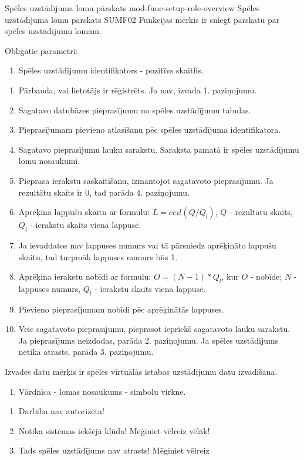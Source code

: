 \moduleFunctionTable
{Spēles uzstādījuma lomu pārskats}
{mod-func-setup-role-overview}
{Spēles uzstādījuma lomu pārskats}
{SUMF02}
{
	Funkcijas mērķis ir sniegt pārskatu par spēles uzstādījumu lomām.
}
{
	Obligātie parametri:
	\begin{enumerate}
		\item Spēles uzstādījumu identifikators - pozitīvs skaitlis.
	\end{enumerate}
}
{
	\begin{enumerate}
		\item Pārbauda, vai lietotājs ir rēģistrēts. Ja nav, izvada 1. paziņojumu.
		\item Sagatavo datubāzes pieprasījumu no spēles uzstādījumu tabulas.
		\item Pieprasījumam pievieno atlasīšanu pēc spēles uzstādījuma identifikatora.
		\item Sagatavo pieprasījumu lauku sarakstu. Saraksta pamatā ir spēles uzstādījumu lomu nosaukumi.
		\item Pieprasa ierakstu saskaitīšanu, izmantojot sagatavoto pieprasījumu.
		      Ja rezultātu skaits ir $0$, tad parāda 4. paziņojumu.
		\item Aprēķina lappušu skaitu ar formulu: $L = ceil(Q / Q_l)$, $Q$ - rezultātu skaits, $Q_l$ - ierakstu skaits vienā lappusē.
		\item Ja ievaddatos nav lappuses numurs vai tā pārsniedz aprēķināto lappušu skaitu, tad turpmāk lappuses numurs būs 1.
		\item Aprēķina ierakstu nobīdi ar formulu: $O = (N - 1) * Q_l$, kur $O$ - nobīde; $N$ - lappuses numurs, $Q_l$ - ierakstu skaits vienā lappusē.
		\item Pievieno pieprasījumam nobīdi pēc aprēķinātās lappuses.
		\item Veic sagatavoto pieprasījumu, pieprasot iepriekš sagatavoto lauku sarakstu. Ja pieprasījums neizdodas, parāda 2. paziņojumu. Ja spēles uzstādījums netika atrasts, parāda 3. paziņojumu.
	\end{enumerate}
}
{
	Izvades datu mērķis ir spēles virtuālās istabas uzstādījumu datu izvadīšana.
	\begin{enumerate}
		\item Vārdnīca - lomas nosaukums - simbolu virkne.
	\end{enumerate}
}
{
	\begin{enumerate}
		\item Darbība nav autorizēta!
		\item Notika sistēmas iekšējā kļūda! Mēģiniet vēlreiz vēlāk!
		\item Tads spēles uzstādījums nav atrasts! Mēģiniet vēlreiz
	\end{enumerate}
}
